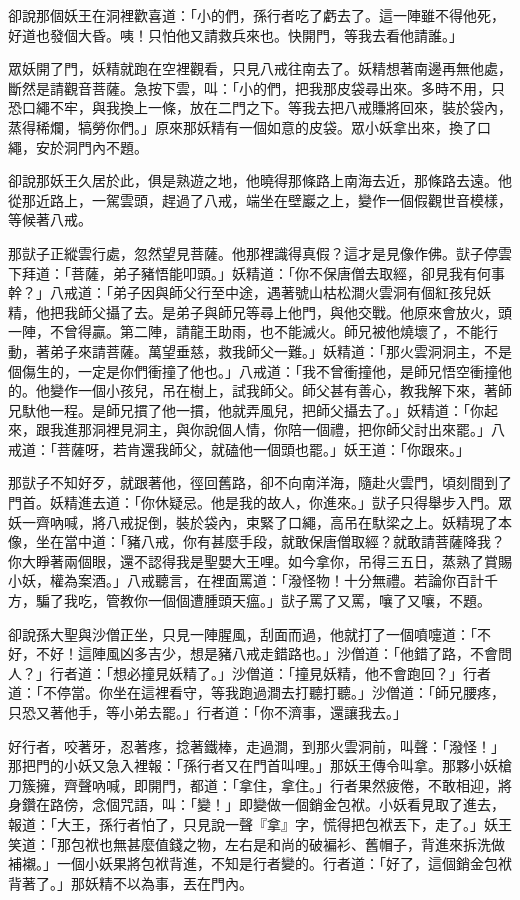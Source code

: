 卻說那個妖王在洞裡歡喜道：「小的們，孫行者吃了虧去了。這一陣雖不得他死，好道也發個大昏。咦！只怕他又請救兵來也。快開門，等我去看他請誰。」

眾妖開了門，妖精就跑在空裡觀看，只見八戒往南去了。妖精想著南邊再無他處，斷然是請觀音菩薩。急按下雲，叫：「小的們，把我那皮袋尋出來。多時不用，只恐口繩不牢，與我換上一條，放在二門之下。等我去把八戒賺將回來，裝於袋內，蒸得稀爛，犒勞你們。」原來那妖精有一個如意的皮袋。眾小妖拿出來，換了口繩，安於洞門內不題。

卻說那妖王久居於此，俱是熟遊之地，他曉得那條路上南海去近，那條路去遠。他從那近路上，一駕雲頭，趕過了八戒，端坐在壁巖之上，變作一個假觀世音模樣，等候著八戒。

那獃子正縱雲行處，忽然望見菩薩。他那裡識得真假？這才是見像作佛。獃子停雲下拜道：「菩薩，弟子豬悟能叩頭。」妖精道：「你不保唐僧去取經，卻見我有何事幹？」八戒道：「弟子因與師父行至中途，遇著號山枯松澗火雲洞有個紅孩兒妖精，他把我師父攝了去。是弟子與師兄等尋上他門，與他交戰。他原來會放火，頭一陣，不曾得贏。第二陣，請龍王助雨，也不能滅火。師兄被他燒壞了，不能行動，著弟子來請菩薩。萬望垂慈，救我師父一難。」妖精道：「那火雲洞洞主，不是個傷生的，一定是你們衝撞了他也。」八戒道：「我不曾衝撞他，是師兄悟空衝撞他的。他變作一個小孩兒，吊在樹上，試我師父。師父甚有善心，教我解下來，著師兄馱他一程。是師兄摜了他一摜，他就弄風兒，把師父攝去了。」妖精道：「你起來，跟我進那洞裡見洞主，與你說個人情，你陪一個禮，把你師父討出來罷。」八戒道：「菩薩呀，若肯還我師父，就磕他一個頭也罷。」妖王道：「你跟來。」

那獃子不知好歹，就跟著他，徑回舊路，卻不向南洋海，隨赴火雲門，頃刻間到了門首。妖精進去道：「你休疑忌。他是我的故人，你進來。」獃子只得舉步入門。眾妖一齊吶喊，將八戒捉倒，裝於袋內，束緊了口繩，高吊在馱梁之上。妖精現了本像，坐在當中道：「豬八戒，你有甚麼手段，就敢保唐僧取經？就敢請菩薩降我？你大睜著兩個眼，還不認得我是聖嬰大王哩。如今拿你，吊得三五日，蒸熟了賞賜小妖，權為案酒。」八戒聽言，在裡面罵道：「潑怪物！十分無禮。若論你百計千方，騙了我吃，管教你一個個遭腫頭天瘟。」獃子罵了又罵，嚷了又嚷，不題。

卻說孫大聖與沙僧正坐，只見一陣腥風，刮面而過，他就打了一個噴嚏道：「不好，不好！這陣風凶多吉少，想是豬八戒走錯路也。」沙僧道：「他錯了路，不會問人？」行者道：「想必撞見妖精了。」沙僧道：「撞見妖精，他不會跑回？」行者道：「不停當。你坐在這裡看守，等我跑過澗去打聽打聽。」沙僧道：「師兄腰疼，只恐又著他手，等小弟去罷。」行者道：「你不濟事，還讓我去。」

好行者，咬著牙，忍著疼，捻著鐵棒，走過澗，到那火雲洞前，叫聲：「潑怪！」那把門的小妖又急入裡報：「孫行者又在門首叫哩。」那妖王傳令叫拿。那夥小妖槍刀簇擁，齊聲吶喊，即開門，都道：「拿住，拿住。」行者果然疲倦，不敢相迎，將身鑽在路傍，念個咒語，叫：「變！」即變做一個銷金包袱。小妖看見取了進去，報道：「大王，孫行者怕了，只見說一聲『拿』字，慌得把包袱丟下，走了。」妖王笑道：「那包袱也無甚麼值錢之物，左右是和尚的破褊衫、舊帽子，背進來拆洗做補襯。」一個小妖果將包袱背進，不知是行者變的。行者道：「好了，這個銷金包袱背著了。」那妖精不以為事，丟在門內。

